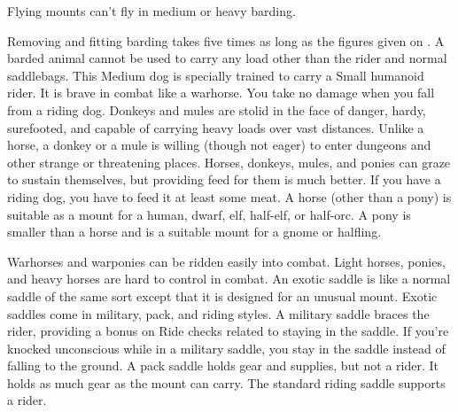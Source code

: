         \par Flying mounts can't fly in medium or heavy barding.
        \par Removing and fitting barding takes five times as long as the figures given on . A barded animal cannot be used to carry any load other than the rider and normal saddlebags.
         This Medium dog is specially trained to carry a Small humanoid rider. It is brave in combat like a warhorse. You take no damage when you fall from a riding dog.
         Donkeys and mules are stolid in the face of danger, hardy, surefooted, and capable of carrying heavy loads over vast distances. Unlike a horse, a donkey or a mule is willing (though not eager) to enter dungeons and other strange or threatening places.
         Horses, donkeys, mules, and ponies can graze to sustain themselves, but providing feed for them is much better. If you have a riding dog, you have to feed it at least some meat.
         A horse (other than a pony) is suitable as a mount for a human, dwarf, elf, half-elf, or half-orc. A pony is smaller than a horse and is a suitable mount for a gnome or halfling.
        \par Warhorses and warponies can be ridden easily into combat. Light horses, ponies, and heavy horses are hard to control in combat.
         An exotic saddle is like a normal saddle of the same sort except that it is designed for an unusual mount. Exotic saddles come in military, pack, and riding styles.
         A military saddle braces the rider, providing a  bonus on Ride checks related to staying in the saddle. If you're knocked unconscious while in a military saddle, you stay in the saddle instead of falling to the ground.
         A pack saddle holds gear and supplies, but not a rider. It holds as much gear as the mount can carry.
         The standard riding saddle supports a rider.

